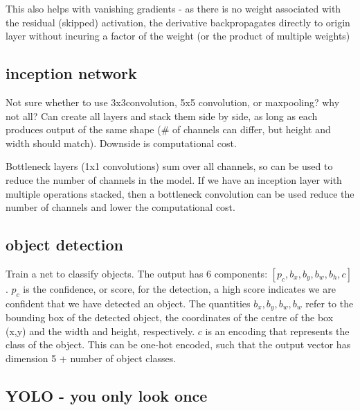 \documentclass{article}
\begin{document}
This also helps with vanishing gradients - as there is no weight associated with the residual (skipped) activation, the derivative backpropagates directly to origin layer without incuring a factor of the weight (or the product of multiple weights)

\subsection{inception network}
Not sure whether to use 3x3convolution, 5x5 convolution, or maxpooling? why not all? Can create all layers and stack them side by side, as long as each produces output of the same shape (\# of channels can differ, but height and width should match).
Downside is computational cost.

Bottleneck layers (1x1 convolutions) sum over all channels, so can be used to reduce the number of channels in the model. If we have an inception layer with multiple operations stacked, then a bottleneck convolution can be used reduce the number of channels and lower the computational cost.

\subsection{object detection}
Train a net to classify objects. The output has 6 components: $[p_c, b_x, b_y, b_w, b_h, c]$. $p_c$ is the confidence, or score, for the detection, a high score indicates we are confident that we have detected an object. The quantities $b_x, b_y, b_w, b_w$ refer to the bounding box of the detected object, the coordinates of the centre of the box (x,y) and the width and height, respectively. $c$ is an encoding that represents the class of the object. This can be one-hot encoded, such that the output vector has dimension 5 + number of object classes.



\subsection{YOLO - you only look once}
\end{document}
